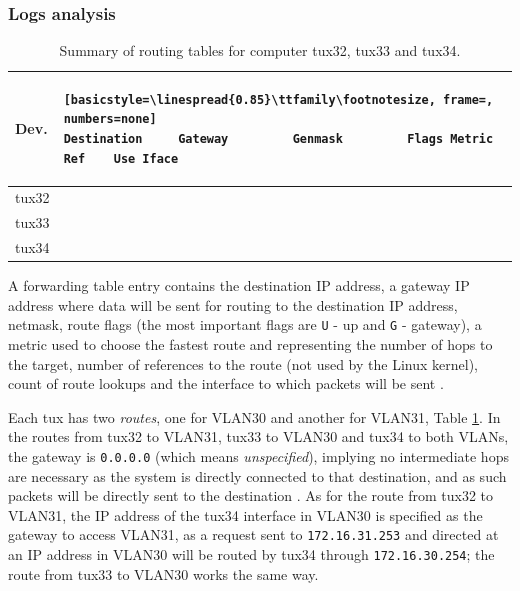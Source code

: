 \documentclass[a4paper, 11pt]{report}
\begin{document}
\subsubsection{Logs analysis} \label{sec:Log3}

\begin{table}[H]
    \centering
    \small
    \begin{tabular}{l | l}
        \textbf{Dev.} & \begin{lstlisting}[basicstyle=\linespread{0.85}\ttfamily\footnotesize, frame=, numbers=none]
Destination     Gateway         Genmask         Flags Metric Ref    Use Iface
            \end{lstlisting} \\ \hline
        tux32 &  \\ \hline
        tux33 &  \\ \hline
        tux34 & 
    \end{tabular}
    \caption{Summary of routing tables for computer tux32, tux33 and tux34.}
    \label{tab:summary-routes}
\end{table}

A forwarding table entry contains the destination IP address, a gateway IP address where data will be sent for routing to the destination IP address, netmask, route flags (the most important flags are \texttt{U} - up and \texttt{G} - gateway), a metric used to choose the fastest route and representing the number of hops to the target, number of references to the route (not used by the Linux kernel), count of route lookups and the interface to which packets will be sent \cite{man-route}.

Each tux has two \textit{routes}, one for VLAN30 and another for VLAN31, Table \ref{tab:summary-routes}.
In the routes from tux32 to VLAN31, tux33 to VLAN30 and tux34 to both VLANs, the gateway is \texttt{0.0.0.0} (which means \textit{unspecified}), implying no intermediate hops are necessary as the system is directly connected to that destination, and as such packets will be directly sent to the destination \cite{routing-basics}.
As for the route from tux32 to VLAN31, the IP address of the tux34 interface in VLAN30 is specified as the gateway to access VLAN31, as a request sent to \texttt{172.16.31.253} and directed at an IP address in VLAN30 will be routed by tux34 through \texttt{172.16.30.254}; the route from tux33 to VLAN30 works the same way. 
\end{document}
